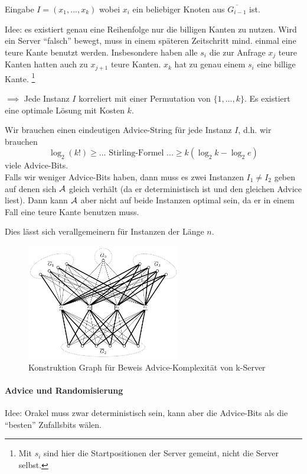 Eingabe $I = (x_1, ..., x_k)$ wobei $x_i$ ein beliebiger Knoten aus $\overline{G_{i-1}}$ ist.

Idee: es existiert genau eine Reihenfolge nur die billigen Kanten zu nutzen. Wird ein Server
``falsch'' bewegt, muss in einem späteren Zeitschritt mind. einmal eine teure Kante benutzt werden.
Insbesondere haben alle $s_i$ die zur Anfrage $x_j$ teure Kanten hatten auch zu $x_{j+1}$ teure Kanten.
$x_k$ hat zu genau einem $s_i$ eine billige Kante.
\footnote{Mit $s_i$ sind hier die Startpositionen der Server gemeint, nicht die Server selbst.}

$\implies$ Jede Instanz $I$ korreliert mit einer Permutation von $\{1, ..., k\}$.
Es existiert eine optimale Lösung mit Kosten $k$.

Wir brauchen einen eindeutigen Advice-String für jede Instanz $I$, d.h. wir brauchen
$$ \log_2 (k!) \geq ... \text{ Stirling-Formel } ... \geq k (\log_2 k - \log_2 e) $$
viele Advice-Bits.
\\
Falls wir weniger Advice-Bits haben, dann muss es zwei Instanzen $I_1 \neq I_2$ geben auf denen sich
$\mathcal{A}$ gleich verhält (da er deterministisch ist und den gleichen Advice liest).
Dann kann $\mathcal{A}$ aber nicht auf beide Instanzen optimal sein, da er in einem Fall eine teure Kante benutzen muss.

Dies lässt sich verallgemeinern für Instanzen der Länge $n$.

\begin{figure}[h]
    \centering
    \includegraphics[width=0.6\textwidth]{images/k-server-advice.png}
    \caption{Konstruktion Graph für Beweis Advice-Komplexität von k-Server}
    \label{k-server-advice}
\end{figure}

\paragraph{Advice und Randomisierung}
Idee: Orakel muss zwar deterministisch sein, kann aber die Advice-Bits als die ``besten''
Zufallsbits wälen.

